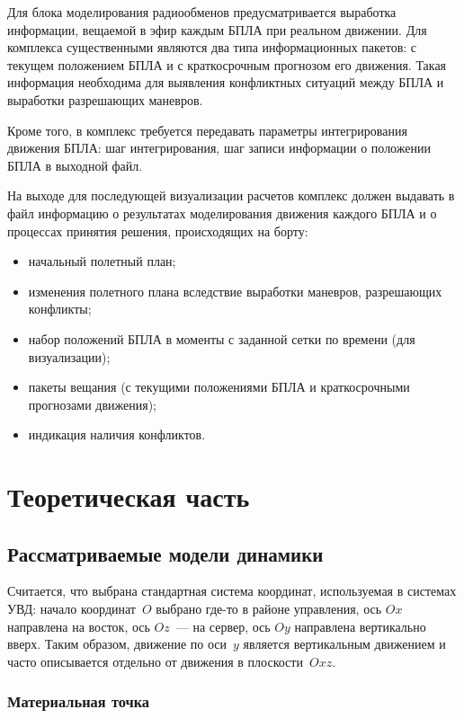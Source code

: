 \documentclass[a4paper,12pt]{article}
\numberwithin{figure}{subsubsection}
\begin{document}
Для блока моделирования радиообменов предусматривается выработка информации, вещаемой в эфир каждым БПЛА при реальном движении. Для комплекса существенными являются два типа информационных пакетов: с текущем положением БПЛА и с краткосрочным прогнозом его движения. Такая информация необходима для выявления конфликтных ситуаций между БПЛА и выработки разрешающих маневров.

Кроме того, в комплекс требуется передавать параметры интегрирования движения БПЛА: шаг интегрирования, шаг записи информации о положении БПЛА в выходной файл.

На выходе для последующей визуализации расчетов комплекс должен выдавать в файл информацию о результатах моделирования движения каждого БПЛА и о процессах принятия решения, происходящих на борту:
\begin{itemize}
  \item начальный полетный план;
  \item изменения полетного плана вследствие выработки маневров, разрешающих конфликты;
  \item набор положений БПЛА в моменты с заданной сетки по времени (для визуализации);
  \item пакеты вещания (с текущими положениями БПЛА и краткосрочными прогнозами движения);
  \item индикация наличия конфликтов.
\end{itemize}

\newpage



\section{Теоретическая часть}

\subsection{Рассматриваемые модели динамики}

Считается, что выбрана стандартная система координат, используемая в системах УВД: начало координат~$O$ выбрано где-то в районе управления, ось $Ox$ направлена на восток, ось $Oz$~--- на сервер, ось $Oy$ направлена вертикально вверх. Таким образом, движение по оси~$y$ является вертикальным движением и часто описывается отдельно от движения в плоскости~$Oxz$.


\subsubsection{Материальная точка}
\end{document}
